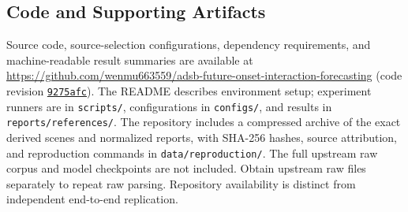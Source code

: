 \documentclass[10pt,journal,letterpaper]{IEEEtran}
\begin{document}
\subsection{Code and Supporting Artifacts}
Source code, source-selection configurations, dependency requirements, and machine-readable result summaries are available at \url{https://github.com/wenmu663559/adsb-future-onset-interaction-forecasting} (code revision \href{https://github.com/wenmu663559/adsb-future-onset-interaction-forecasting/tree/9275afc5b6befa4f9e9525234ddca2b2b103f647}{\texttt{9275afc}}). The README describes environment setup; experiment runners are in \texttt{scripts/}, configurations in \texttt{configs/}, and results in \texttt{reports/references/}. The repository includes a compressed archive of the exact derived scenes and normalized reports, with SHA-256 hashes, source attribution, and reproduction commands in \texttt{data/reproduction/}. The full upstream raw corpus and model checkpoints are not included. Obtain upstream raw files separately to repeat raw parsing. Repository availability is distinct from independent end-to-end replication.
\end{document}
